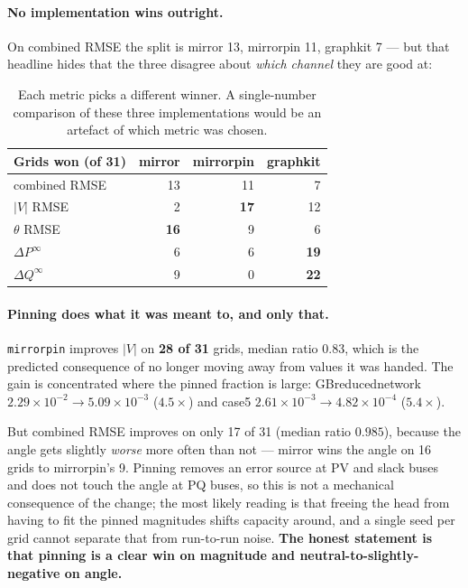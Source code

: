 \documentclass[10pt]{article}
\begin{document}
\paragraph{No implementation wins outright.} On combined RMSE the split is
mirror 13, mirrorpin 11, graphkit 7 --- but that headline hides that the three
disagree about \emph{which channel} they are good at:

\begin{table}[H]
\centering
\small
\begin{tabular}{lrrr}
\toprule
Grids won (of 31) & mirror & mirrorpin & graphkit \\
\midrule
combined RMSE   & 13 & 11 & 7 \\
$|V|$ RMSE      &  2 & \textbf{17} & 12 \\
$\theta$ RMSE   & \textbf{16} &  9 & 6 \\
$\Delta P^{\infty}$ &  6 &  6 & \textbf{19} \\
$\Delta Q^{\infty}$ &  9 &  0 & \textbf{22} \\
\bottomrule
\end{tabular}
\caption{Each metric picks a different winner. A single-number comparison of
these three implementations would be an artefact of which metric was chosen.}
\end{table}

\paragraph{Pinning does what it was meant to, and only that.} \texttt{mirrorpin}
improves $|V|$ on \textbf{28 of 31} grids, median ratio $0.83$, which is the
predicted consequence of no longer moving away from values it was handed. The
gain is concentrated where the pinned fraction is large: GBreducednetwork
$2.29\times10^{-2}\rightarrow5.09\times10^{-3}$ ($4.5\times$) and case5
$2.61\times10^{-3}\rightarrow4.82\times10^{-4}$ ($5.4\times$).

But combined RMSE improves on only 17 of 31 (median ratio $0.985$), because the
angle gets slightly \emph{worse} more often than not --- mirror wins the angle
on 16 grids to mirrorpin's 9. Pinning removes an error source at PV and slack
buses and does not touch the angle at PQ buses, so this is not a mechanical
consequence of the change; the most likely reading is that freeing the head from
having to fit the pinned magnitudes shifts capacity around, and a single seed
per grid cannot separate that from run-to-run noise. \textbf{The honest
statement is that pinning is a clear win on magnitude and neutral-to-slightly-negative
on angle.}
\end{document}
